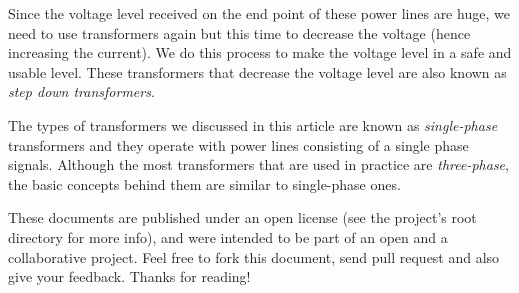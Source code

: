 \documentclass{article}
\begin{document}
	Since the voltage level received on the end point of these power lines are huge, we need to use transformers again but this time to decrease the voltage (hence increasing the current).
	We do this process to make the voltage level in a safe and usable level. These transformers that decrease the voltage level are also known as \textit{step down transformers}.
	
	The types of transformers we discussed in this article are known as \textit{single-phase} transformers and they operate with power lines consisting of a single phase signals. 
	Although the most transformers that are used in practice are \textit{three-phase}, the basic concepts behind them are similar to single-phase ones.
	
	These documents are published under an open license (see the project's root directory for more info), and were intended to be part of an open and a collaborative project. Feel free to fork this document, send pull request and also give your feedback. Thanks for reading!
	
\end{document}

